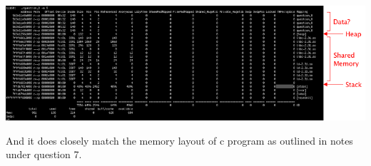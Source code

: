 \documentclass[12pt]{article}
\begin{document}
\begin{enumerate}[1.]
    \bigskip

    \begin{center}
    \includegraphics[width=\linewidth]{images/worksheet_6_solution_8.png}
    \end{center}

    \bigskip

    And it does closely match the memory layout of c program as outlined in notes
    under question 7.

\end{enumerate}
\end{document}
